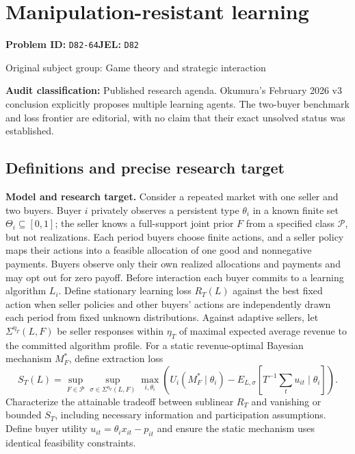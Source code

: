 \documentclass[11pt,a4paper]{article}
\begin{document}
\section*{Manipulation-resistant learning}
\textbf{Problem ID:} \texttt{D82-64}\quad \textbf{JEL:} \texttt{D82}\par
\label{problem:OP-0287}
{\sffamily\small\color{muted}Original subject group: Game theory and strategic interaction\par}
\label{definitions:problem:30007569}
\textbf{Audit classification:} Published research agenda. Okumura’s February 2026 v3 conclusion explicitly proposes multiple learning agents. The two-buyer benchmark and loss frontier are editorial, with no claim that their exact unsolved status was established.
\subsection*{Definitions and precise research target}
\textbf{Model and research target.} Consider a repeated market with one seller and two buyers. Buyer \(i\) privately observes a persistent type \(\theta_i\) in a known finite set \(\Theta_i\subseteq[0,1]\); the seller knows a full-support joint prior \(F\) from a specified class \(\mathcal P\), but not realizations. Each period buyers choose finite actions, and a seller policy maps their actions into a feasible allocation of one good and nonnegative payments. Buyers observe only their own realized allocations and payments and may opt out for zero payoff. Before interaction each buyer commits to a learning algorithm \(L_i\). Define stationary learning loss \(R_T(L)\) against the best fixed action when seller policies and other buyers’ actions are independently drawn each period from fixed unknown distributions. Against adaptive sellers, let \(\Sigma^{\eta_T}(L,F)\) be seller responses within \(\eta_T\) of maximal expected average revenue to the committed algorithm profile. For a static revenue-optimal Bayesian mechanism \(M_F^*\), define extraction loss
\[
 S_T(L)=\sup_{F\in\mathcal P}\sup_{\sigma\in\Sigma^{\eta_T}(L,F)}\max_{i,\theta_i}
 \left(U_i(M_F^*\mid\theta_i)-E_{L,\sigma}[T^{-1}\textstyle\sum_t u_{it}\mid\theta_i]\right).
\]
Characterize the attainable tradeoff between sublinear \(R_T\) and vanishing or bounded \(S_T\), including necessary information and participation assumptions. Define buyer utility \(u_{it}=\theta_i x_{it}-p_{it}\) and ensure the static mechanism uses identical feasibility constraints.
\end{document}
